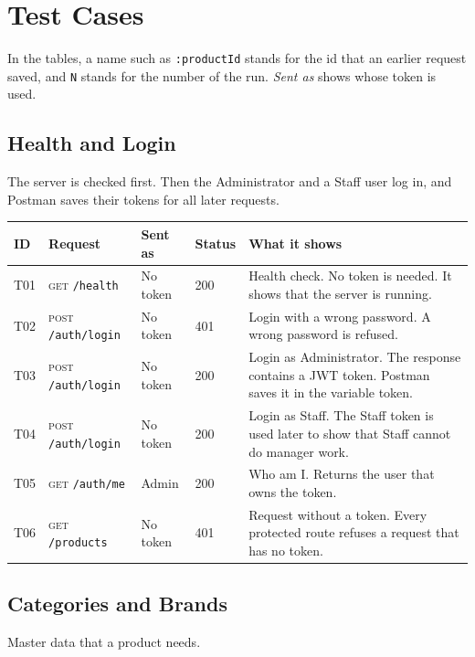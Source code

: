 \documentclass[11pt,a4paper]{article}
\newcommand{\code}[1]{\texttt{#1}}
\begin{document}
\section{Test Cases}
In the tables, a name such as \code{:productId} stands for the id that an earlier request saved, and \code{N} stands for the number of the run. \emph{Sent as} shows whose token is used.

\subsection{Health and Login}
The server is checked first. Then the Administrator and a Staff user log in, and Postman saves their tokens for all later requests.

\begin{longtable}{@{}P{0.7cm}P{5.0cm}P{1.3cm}P{1.15cm}P{5.75cm}@{}}
\toprule
\textbf{ID} & \textbf{Request} & \textbf{Sent as} & \textbf{Status} & \textbf{What it shows} \\
\midrule
\endhead
T01 & \textsc{get} \code{/\allowbreak{}health} & No token & 200 & Health check. No token is needed. It shows that the server is running. \\
T02 & \textsc{post} \code{/\allowbreak{}auth/\allowbreak{}login} & No token & 401 & Login with a wrong password. A wrong password is refused. \\
T03 & \textsc{post} \code{/\allowbreak{}auth/\allowbreak{}login} & No token & 200 & Login as Administrator. The response contains a JWT token. Postman saves it in the variable token. \\
T04 & \textsc{post} \code{/\allowbreak{}auth/\allowbreak{}login} & No token & 200 & Login as Staff. The Staff token is used later to show that Staff cannot do manager work. \\
T05 & \textsc{get} \code{/\allowbreak{}auth/\allowbreak{}me} & Admin & 200 & Who am I. Returns the user that owns the token. \\
T06 & \textsc{get} \code{/\allowbreak{}products} & No token & 401 & Request without a token. Every protected route refuses a request that has no token. \\
\bottomrule
\end{longtable}

\subsection{Categories and Brands}
Master data that a product needs.
\end{document}
